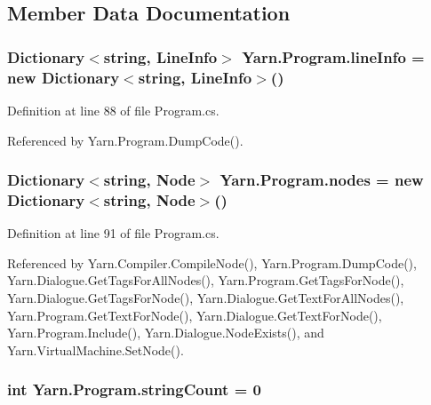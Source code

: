 \subsection{Member Data Documentation}
\hypertarget{a00154_a0d4da395947767b4a1eaaff8a9842adc}{
\subsubsection[{line\-Info}]{\setlength{\rightskip}{0pt plus 5cm}Dictionary$<$string, {\bf Line\-Info}$>$ Yarn.\-Program.\-line\-Info = new Dictionary$<$string, {\bf Line\-Info}$>$()\hspace{0.3cm}{\ttfamily [package]}}}\label{a00154_a0d4da395947767b4a1eaaff8a9842adc}


Definition at line 88 of file Program.\-cs.



Referenced by Yarn.\-Program.\-Dump\-Code().

\hypertarget{a00154_a3f4928a577c88263ad016be259b175c4}{
\subsubsection[{nodes}]{\setlength{\rightskip}{0pt plus 5cm}Dictionary$<$string, {\bf Node}$>$ Yarn.\-Program.\-nodes = new Dictionary$<$string, {\bf Node}$>$()\hspace{0.3cm}{\ttfamily [package]}}}\label{a00154_a3f4928a577c88263ad016be259b175c4}


Definition at line 91 of file Program.\-cs.



Referenced by Yarn.\-Compiler.\-Compile\-Node(), Yarn.\-Program.\-Dump\-Code(), Yarn.\-Dialogue.\-Get\-Tags\-For\-All\-Nodes(), Yarn.\-Program.\-Get\-Tags\-For\-Node(), Yarn.\-Dialogue.\-Get\-Tags\-For\-Node(), Yarn.\-Dialogue.\-Get\-Text\-For\-All\-Nodes(), Yarn.\-Program.\-Get\-Text\-For\-Node(), Yarn.\-Dialogue.\-Get\-Text\-For\-Node(), Yarn.\-Program.\-Include(), Yarn.\-Dialogue.\-Node\-Exists(), and Yarn.\-Virtual\-Machine.\-Set\-Node().

\hypertarget{a00154_a8ef1d10094ef00311aade6715ba78ec7}{
\subsubsection[{string\-Count}]{\setlength{\rightskip}{0pt plus 5cm}int Yarn.\-Program.\-string\-Count = 0\hspace{0.3cm}{\ttfamily [private]}}}\label{a00154_a8ef1d10094ef00311aade6715ba78ec7}


